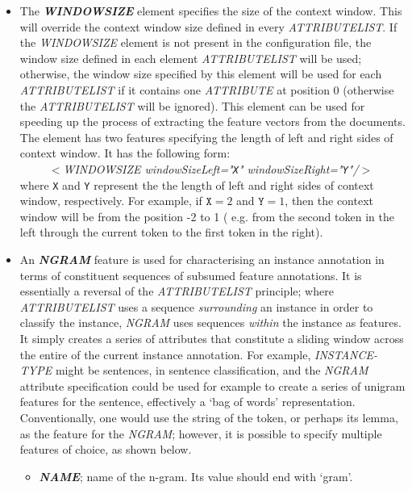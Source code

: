 \begin{itemize}
\item The {\em {\bf WINDOWSIZE}} element specifies the size of the context
window. This will override the context window size defined in every {\em
ATTRIBUTELIST}. If the {\em WINDOWSIZE} element is not present in the
configuration file, the window size defined in each element {\em ATTRIBUTELIST}
will be used; otherwise, the window size specified by this element will be used for each
{\em ATTRIBUTELIST} if it contains one {\em ATTRIBUTE} at position 0 (otherwise
the {\em ATTRIBUTELIST} will be ignored).  This element can be used for speeding
up the process of extracting the feature vectors from the documents. The element has two
features specifying the length of left
and right sides of context window. It has the following form:\\
\ \ \ \ \ {\em $<$WINDOWSIZE windowSizeLeft="\texttt{X}"
windowSizeRight="\texttt{Y}"/$>$}\\ where \texttt{X} and \texttt{Y} represent the
the length of left and right sides of context window, respectively. For example,
if $\texttt{X}=2$ and $\texttt{Y}=1$, then the context window will be from the
position -2 to 1 ( e.g. from the second token in the left through the current
token to the first token in the right).

\item An {\em {\bf NGRAM}} feature is used for characterising an instance
annotation in terms of constituent sequences of subsumed feature annotations. It
is essentially a reversal of the {\em ATTRIBUTELIST} principle; where {\em
ATTRIBUTELIST} uses a sequence {\em surrounding} an instance in order to classify
the instance, {\em NGRAM} uses sequences {\em within} the instance as features.
It simply creates a series of attributes that constitute a sliding window across
the entire of the current instance annotation. For example, {\em INSTANCE-TYPE}
might be sentences, in sentence classification, and the {\em NGRAM} attribute
specification could be used for example to create a series of unigram features
for the sentence, effectively a `bag of words' representation. Conventionally,
one would use the string of the token, or perhaps its lemma, as the feature for
the {\em NGRAM}; however, it is possible to specify multiple features of choice,
as shown below.

\begin{itemize}
  
\item {\em {\bf NAME}}; name of the n-gram. Its value should end with `gram'.


\end{itemize}
\end{itemize}
